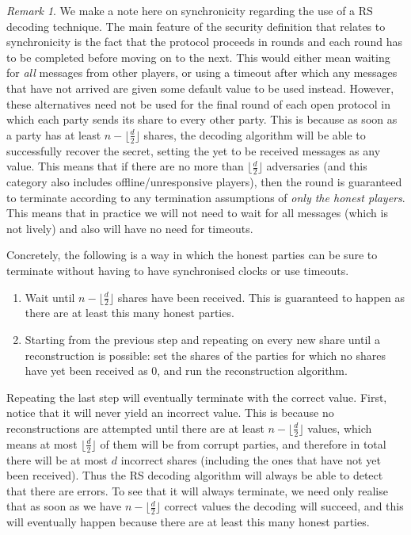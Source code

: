 \documentclass{article}
\theoremstyle{remark}
\newtheorem{remark}{Remark}
\begin{document}
\begin{remark}\label{rem:openSync}
	We make a note here on synchronicity regarding the use of a RS decoding
	technique. The main feature of the security definition that relates to
	synchronicity is the fact that the protocol proceeds in rounds and each
	round has to be completed before moving on to the next. This would either
	mean waiting for \textit{all} messages from other players, or using a
	timeout after which any messages that have not arrived are given some
	default value to be used instead. However, these alternatives need not be
	used for the final round of each open protocol in which each party sends
	its share to every other party. This is because as soon as a party has at
	least $n - \lfloor \frac{d}{2} \rfloor$ shares, the decoding algorithm will
	be able to successfully recover the secret, setting the yet to be received
	messages as any value. This means that if there are no more than $\lfloor
	\frac{d}{2} \rfloor$ adversaries (and this category also includes
	offline/unresponsive players), then the round is guaranteed to terminate
	according to any termination assumptions of \textit{only the honest
	players}. This means that in practice we will not need to wait for all
	messages (which is not lively) and also will have no need for timeouts.

	Concretely, the following is a way in which the honest parties can be sure
	to terminate without having to have synchronised clocks or use timeouts.
	\begin{enumerate}
		\item Wait until $n - \lfloor \frac{d}{2} \rfloor$ shares have been
			received. This is guaranteed to happen as there are at least this
			many honest parties.
		\item Starting from the previous step and repeating on every new share
			until a reconstruction is possible: set the shares of the parties
			for which no shares have yet been received as $0$, and run the
			reconstruction algorithm.
	\end{enumerate}
	Repeating the last step will eventually terminate with the correct value.
	First, notice that it will never yield an incorrect value. This is because
	no reconstructions are attempted until there are at least $n - \lfloor
	\frac{d}{2} \rfloor$ values, which means at most $\lfloor \frac{d}{2}
	\rfloor$ of them will be from corrupt parties, and therefore in total there
	will be at most $d$ incorrect shares (including the ones that have not yet
	been received). Thus the RS decoding algorithm will always be able to
	detect that there are errors. To see that it will always terminate, we need
	only realise that as soon as we have $n - \lfloor \frac{d}{2} \rfloor$
	correct values the decoding will succeed, and this will eventually happen
	because there are at least this many honest parties.
\end{remark}
\end{document}
